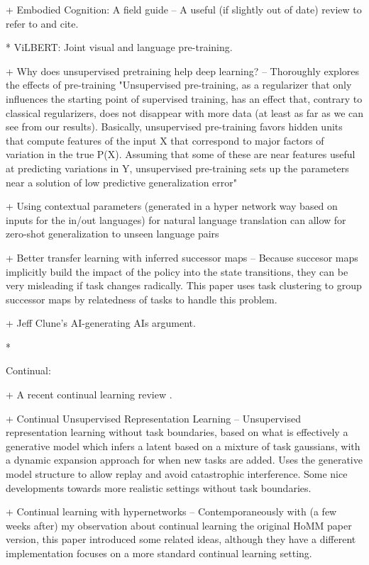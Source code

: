 + Embodied Cognition: A field guide -- A useful (if slightly out of date) review to refer to and cite. \citep{Anderson2003}

* ViLBERT: Joint visual and language pre-training. \citep{Lu2019}

+ Why does unsupervised pretraining help deep learning? -- Thoroughly explores the effects of pre-training
"Unsupervised pre-training, as a regularizer that only influences the starting point of
supervised training, has an effect that, contrary to classical regularizers, does not disappear with
more data (at least as far as we can see from our results). Basically, unsupervised pre-training favors
hidden units that compute features of the input X that correspond to major factors of variation in
the true P(X). Assuming that some of these are near features useful at predicting variations in Y,
unsupervised pre-training sets up the parameters near a solution of low predictive generalization error" \citep{Erhan2010}

+ Using contextual parameters (generated in a hyper network way based on inputs for the in/out languages) for natural language translation can allow for zero-shot generalization to unseen language pairs \citep{Platanios2017}

+ Better transfer learning with inferred successor maps -- Because succesor maps implicitly build the impact of the policy into the state transitions, they can be very misleading if task changes radically. This paper uses task clustering to group successor maps by relatedness of tasks to handle this problem. \citep{Madarasz2019}

+ Jeff Clune's AI-generating AIs argument. \citep{Clune2019}

*




Continual:

+ A recent continual learning review \citep{Parisi2019}.

+ Continual Unsupervised Representation Learning -- Unsupervised representation learning without task boundaries, based on what is effectively a generative model which infers a latent based on a mixture of task gaussians, with a dynamic expansion approach for when new tasks are added. Uses the generative model structure to allow replay and avoid catastrophic interference. Some nice developments towards more realistic settings without task boundaries. \citep{Rao2019}

+ Continual learning with hypernetworks -- Contemporaneously with (a few weeks after) my observation about continual learning the original HoMM paper version, this paper introduced some related ideas, although they have a different implementation focuses on a more standard continual learning setting. \citep{Oswald2020}


